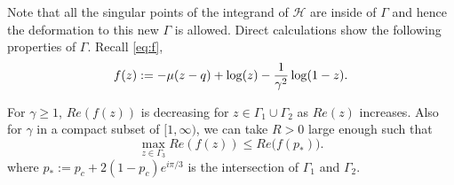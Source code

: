 \documentclass[11pt]{article}
\begin{document}
Note that all the singular points of the integrand of
$\mathcal{H}$ are inside of $\Gamma$ and hence the deformation to
this new $\Gamma$ is allowed. Direct calculations show the
following properties of $\Gamma$. Recall \eqref{eq:f},
\begin{equation}
   f(z) := -\mu (z-q) +\log(z) - \frac1{\gamma^2}\log(1-z).
\end{equation}


\begin{lemma}\label{lem:Refdecreasing}
For $\gamma\ge 1$, $Re(f(z))$ is decreasing for
$z\in\Gamma_1\cup\Gamma_2$ as $Re(z)$ increases. Also for $\gamma$
in a compact subset of $[1,\infty)$, we can take $R>0$ large enough
such that
\begin{equation}
  \max_{z\in\Gamma_3} Re(f(z)) \le Re \bigl(f(p_*)\bigr).
\end{equation}
where $p_*:=p_c+2(1-p_c)e^{i\pi/3}$ is the intersection of
$\Gamma_1$ and $\Gamma_2$.
\end{lemma}
\end{document}
